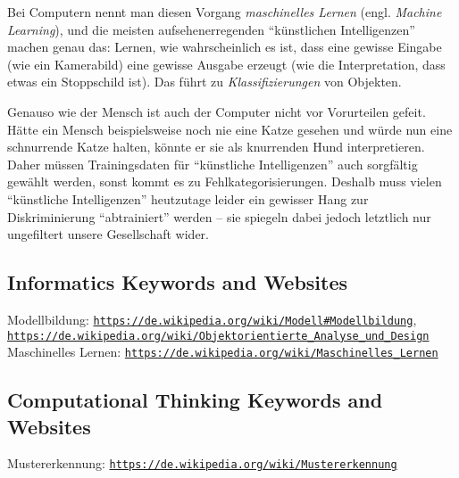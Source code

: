 \documentclass[a4paper,11pt]{report}
\newcommand{\BrochureUrlText}[1]{\texttt{#1}}
\begin{document}
Bei Computern nennt man diesen Vorgang \emph{maschinelles Lernen} (engl. \emph{Machine Learning}), und die meisten aufsehenerregenden \enquote{künstlichen Intelligenzen} machen genau das: Lernen, wie wahrscheinlich es ist, dass eine gewisse Eingabe (wie ein Kamerabild) eine gewisse Ausgabe erzeugt (wie die Interpretation, dass etwas ein Stoppschild ist). Das führt zu \emph{Klassifizierungen} von Objekten.

Genauso wie der Mensch ist auch der Computer nicht vor Vorurteilen gefeit. Hätte ein Mensch beispielsweise noch nie eine Katze gesehen und würde nun eine schnurrende Katze halten, könnte er sie als knurrenden Hund interpretieren. Daher müssen Trainingsdaten für \enquote{künstliche Intelligenzen} auch sorgfältig gewählt werden, sonst kommt es zu Fehlkategorisierungen. Deshalb muss vielen \enquote{künstliche Intelligenzen} heutzutage leider ein gewisser Hang zur Diskriminierung \enquote{abtrainiert} werden – sie spiegeln dabei jedoch letztlich nur ungefiltert unsere Gesellschaft wider.


\subsection*{Informatics Keywords and Websites}

Modellbildung: \href{https://de.wikipedia.org/wiki/Modell\#Modellbildung}{\BrochureUrlText{https://de.wikipedia.org/wiki/Modell\#Modellbildung}}, \href{https://de.wikipedia.org/wiki/Objektorientierte_Analyse_und_Design}{\BrochureUrlText{https://de.wikipedia.org/wiki/Objektorientierte\_Analyse\_und\_Design}}
Maschinelles Lernen: \href{https://de.wikipedia.org/wiki/Maschinelles_Lernen}{\BrochureUrlText{https://de.wikipedia.org/wiki/Maschinelles\_Lernen}}


\subsection*{Computational Thinking Keywords and Websites}

Mustererkennung: \href{https://de.wikipedia.org/wiki/Mustererkennung}{\BrochureUrlText{https://de.wikipedia.org/wiki/Mustererkennung}}
\end{document}
